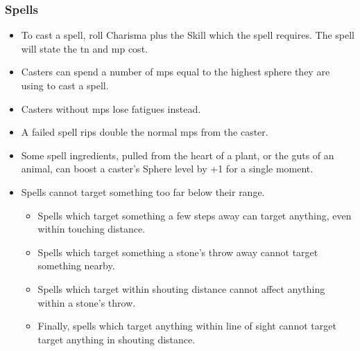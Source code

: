 \subsubsection*{Spells}
\begin{itemize}
  \item
  To cast a spell, roll Charisma plus the Skill which the spell requires.
  The spell will state the \gls{tn} and \gls{mp} cost.
  \item
  Casters can spend a number of \glspl{mp} equal to the highest sphere they are using to cast a spell.
  \item
  Casters without \glspl{mp} lose \glspl{fatigue} instead.
  \item
  A failed spell rips double the normal \glspl{mp} from the caster.
  \item
  Some spell \glspl{ingredient}, pulled from the heart of a plant, or the guts of an animal, can boost a caster's Sphere level by +1 for a single moment.
  \item
  Spells cannot target something too far below their range.
  \begin{itemize}
    \item
    Spells which target something a few steps away can target anything, even within touching distance.
    \item
    Spells which target something a stone's throw away cannot target something nearby.
    \item
    Spells which target within shouting distance cannot affect anything within a stone's throw.
    \item
    Finally, spells which target anything within line of sight cannot target target anything in shouting distance.
  \end{itemize}
\end{itemize}
